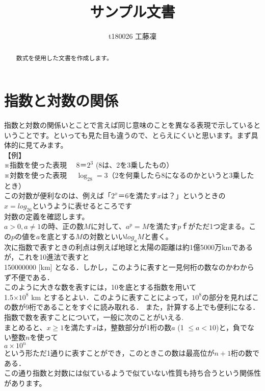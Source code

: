 \documentclass[dvipdfmx,autodetect-engine]{jsarticle}
\title{サンプル文書}
\author{t180026 工藤凜}
\begin{document}
\maketitle

\begin{abstract}
数式を使用した文書を作成します。    
\end{abstract}

\section{指数と対数の関係}
指数と対数の関係いとことで言えば同じ意味のことを異なる表現で示しているということです。といっても見た目も違うので、とらえにくいと思います。まず具体的に見てみます。
\\【例】
\\※指数を使った表現
　$8＝2^3$  (8は、2を3乗したもの）
\\※対数を使った表現
　$\log_28=3$（2を何乗したら8になるのかというと3乗したとき）
\\この対数が便利なのは、例えば「$2^x＝6$を満たす$x$は？」というときの
\\$x=log_26$というように表せるところです
\\対数の定義を確認します。
\\$a>0,a\neq1$の時、正の数$M$に対して、$a^p=M$を満たす$p$ｆがただ1つ定まる。この$p$の値を$a$を底とする$M$の対数といい$log_aM$と書く。
\\次に指数で表すときの利点は例えば地球と太陽の距離は約1億5000万kmであるが，これを10進法で表すと
\\150000000 [km]
となる．しかし，このように表すと一見何桁の数なのかわからず不便である．
\\このように大きな数を表すには，10を底とする指数を用いて
\\1.5×$10^8$ km
とするとよい．このように表すことによって，$10^8$の部分を見ればこの数が9桁であることをすぐに読み取れる． また，計算する上でも便利になる．指数で数を表すことについて，一般に次のことがいえる.
\\まとめると、$x\geq1$を満たす$x$は，整数部分が1桁の数$a$ (1
$ \leq a<10$)と，負でない整数$n$を使って
\\ $a\times 10^n$
\\という形ただ1通りに表すことができ，このときこの数は最高位が$n+1$桁の数である．
\\この通り指数と対数には似ているようで似ていない性質も持ち合うという関係性があります。  
\end{document}
